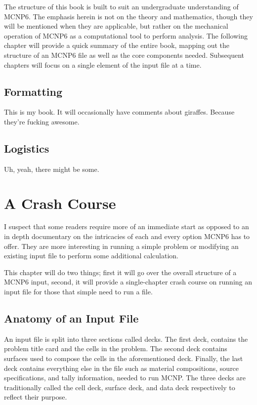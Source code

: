 \documentclass[10pt,a4paper]{book}
\begin{document}
The structure of this book is built to suit an undergraduate understanding of MCNP6. The emphasis herein is not on the theory and mathematics, though they will be mentioned when they are applicable, but rather on the mechanical operation of MCNP6 as a computational tool to perform analysis. The following chapter will provide a quick summary of the entire book, mapping out the structure of an MCNP6 file as well as the core components needed. Subsequent chapters will focus on a single element of the input file at a time.


\section{Formatting}
This is my book. It will occasionally have comments about giraffes. Because they're fucking awesome.

\section{Logistics}

Uh, yeah, there might be some.

\chapter{A Crash Course}

I suspect that some readers require more of an immediate start as opposed to an in depth documentary on the intricacies of each and every option MCNP6 has to offer. They are more interesting in running a simple problem or modifying an existing input file to perform some additional calculation.

This chapter will do two things; first it will go over the overall structure of a MCNP6 input, second, it will provide a single-chapter crash course on running an input file for those that simple need to run a file.

\section{Anatomy of an Input File}

An input file is split into three sections called decks. The first deck, contains the problem title card and the cells in the problem. The second deck contains surfaces used to compose the cells in the aforementioned deck. Finally, the last deck contains everything else in the file such as material compositions, source specifications, and tally information, needed to run MCNP. The three decks are traditionally called the cell deck, surface deck, and data deck respectively to reflect their purpose.
\end{document}
